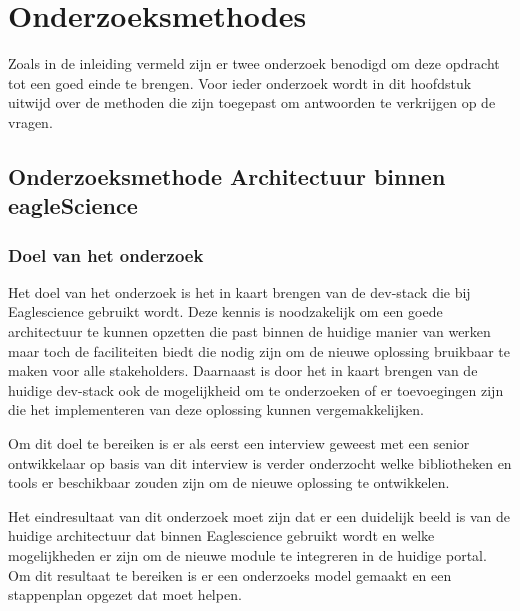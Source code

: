 
\chapter{Onderzoeksmethodes} %

\label{OnderzoeksMethode} %
Zoals in de inleiding vermeld zijn er twee onderzoek benodigd om deze opdracht tot een goed einde te brengen. Voor ieder onderzoek wordt in dit hoofdstuk uitwijd over de methoden die zijn toegepast om antwoorden te verkrijgen op de vragen.



\section{Onderzoeksmethode Architectuur binnen eagleScience}
\subsection{Doel van het onderzoek}
Het doel van het onderzoek is het in kaart brengen van de dev-stack die bij Eaglescience gebruikt wordt. Deze kennis is noodzakelijk om een goede architectuur te kunnen opzetten die past binnen de huidige manier van werken maar toch de faciliteiten biedt die nodig zijn om de nieuwe oplossing bruikbaar te maken voor alle stakeholders. Daarnaast is door het in kaart brengen van de huidige dev-stack ook de mogelijkheid om te onderzoeken of er toevoegingen zijn die het implementeren van deze oplossing kunnen vergemakkelijken.

Om dit doel te bereiken is er als eerst een interview geweest met een senior ontwikkelaar op basis van dit interview is verder onderzocht welke bibliotheken en tools er beschikbaar zouden zijn om de nieuwe oplossing te ontwikkelen.

Het eindresultaat van dit onderzoek moet zijn dat er een duidelijk beeld is van de huidige architectuur dat binnen Eaglescience gebruikt wordt en welke mogelijkheden er zijn om de nieuwe module te integreren in de huidige portal.  Om dit resultaat te bereiken is er een onderzoeks model gemaakt en een stappenplan opgezet dat moet helpen.

